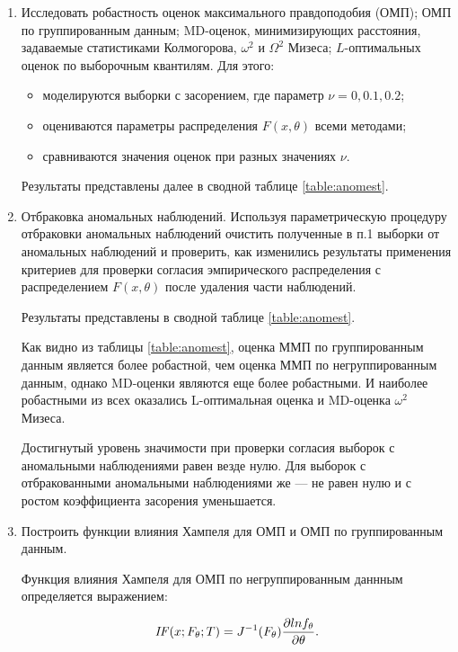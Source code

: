 \documentclass[a4paper,12pt]{article}
\begin{document}
\begin{enumerate}
\item Исследовать робастность оценок максимального правдоподобия (ОМП);
ОМП по группированным данным; MD-оценок, минимизирующих расстояния,
задаваемые статистиками Колмогорова, $\omega^2$ и $\Omega^2$ Мизеса;
$L$-оптимальных оценок по выборочным квантилям. Для этого:
	\begin{itemize}
	\item моделируются выборки с засорением, где параметр $\nu = 0, 0.1, 0.2$;
	\item оцениваются параметры распределения $F(x, \theta)$ всеми методами;
	\item сравниваются значения оценок при разных значениях $\nu$.
	\end{itemize}

Результаты представлены далее в сводной таблице \ref{table:anomest}.

\item Отбраковка аномальных наблюдений. Используя параметрическую
процедуру отбраковки аномальных наблюдений очистить полученные в п.1
выборки от аномальных наблюдений и проверить, как изменились результаты
применения критериев для проверки согласия эмпирического распределения с
распределением $F(x, \theta)$ после удаления части наблюдений.

Результаты представлены в сводной таблице \ref{table:anomest}. 

\def\inputGnumericTable{}


Как видно из таблицы \ref{table:anomest}, оценка ММП по
группированным данным является более робастной, чем оценка ММП по
негруппированным данным, однако MD-оценки являются еще более робастными.
И наиболее робастными из всех оказались L-оптимальная оценка и MD-оценка
$\omega^2$ Мизеса.

Достигнутый уровень значимости при проверки согласия выборок с аномальными
наблюдениями равен везде нулю. Для выборок с отбракованными аномальными
наблюдениями же --- не равен нулю и с ростом коэффициента засорения уменьшается.

\item Построить функции влияния Хампеля для ОМП и ОМП по
группированным данным.

Функция влияния Хампеля для ОМП по негруппированным даннным определяется
выражением:

\begin{equation} \label{eq:if}
	\mbox{\emph{IF}}(x;F_\theta;T) = J^{-1}(F_\theta) 
	\frac{\partial ln f_\theta}{\partial \theta}.
\end{equation}


\end{enumerate}
\end{document}
